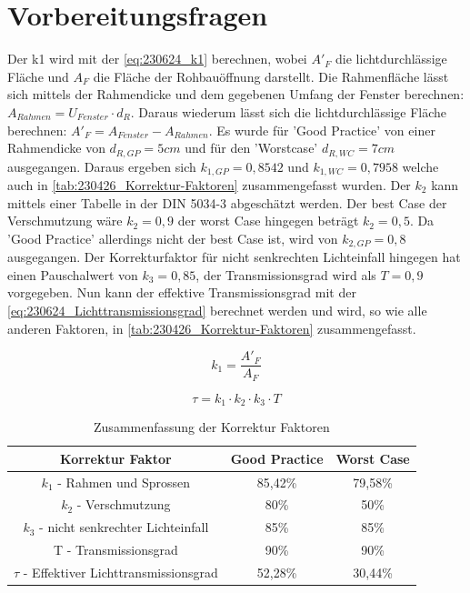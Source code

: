 \section{Vorbereitungsfragen}
\label{sec:Vorbereitungsfragen}

Der k1 wird mit der \autoref{eq:230624_k1} berechnen, wobei $A'_F$ die lichtdurchlässige Fläche und $A_F$ die Fläche der Rohbauöffnung darstellt.
Die Rahmenfläche lässt sich mittels der Rahmendicke und dem gegebenen Umfang der Fenster berechnen: $A_{Rahmen} = U_{Fenster} \cdot d_R$. 
Daraus wiederum lässt sich die lichtdurchlässige Fläche berechnen:  $A'_F = A_{Fenster} - A_{Rahmen}$.
Es wurde für 'Good Practice' von einer Rahmendicke von $d_{R,GP} = 5cm$ und für den 'Worstcase' $d_{R,WC} = 7 cm$ ausgegangen.
Daraus ergeben sich $k_{1,GP} = 0,8542$ und $k_{1,WC} = 0,7958$ welche auch in \autoref{tab:230426_Korrektur-Faktoren} zusammengefasst wurden.
Der $k_2$ kann mittels einer Tabelle in der DIN 5034-3 abgeschätzt werden.
Der best Case der Verschmutzung wäre $k_2 = 0,9$ der worst Case hingegen beträgt $k_2 = 0,5$.
Da 'Good Practice' allerdings nicht der best Case ist, wird von $k_{2,GP} = 0,8$ ausgegangen.
Der Korrekturfaktor für nicht senkrechten Lichteinfall hingegen hat einen Pauschalwert von $k_3 = 0,85$, der Transmissionsgrad wird als $T = 0,9$ vorgegeben.
Nun kann der effektive Transmissionsgrad mit der \autoref{eq:230624_Lichttransmissionsgrad} berechnet werden und wird, so wie alle anderen Faktoren, in \autoref{tab:230426_Korrektur-Faktoren} zusammengefasst.


\begin{equation}
    k_1 = \frac{A'_F}{A_F}
    \label{eq:230624_k1}
\end{equation}

\begin{equation}
    \tau = k_1 \cdot k_2 \cdot k_3 \cdot T
    \label{eq:230624_Lichttransmissionsgrad}
\end{equation}


\begin{table}[H]
    \caption{Zusammenfassung der Korrektur Faktoren}
    \centering
    \begin{tabular}{|c|c|c|}
    \hline
    \rowcolor[HTML]{70AD47} 
    Korrektur Faktor                                & Good Practice & Worst Case \\\hline
    \rowcolor[HTML]{CFE5A8} 
    $k_1$ - Rahmen und Sprossen                     & 85,42\%       & 79,58\%    \\\hline
    \rowcolor[HTML]{A9D08E} 
    $k_2$ - Verschmutzung                           & 80\%          & 50\%       \\\hline
    \rowcolor[HTML]{CFE5A8} 
    $k_3$ - nicht senkrechter Lichteinfall          & 85\%          & 85\%       \\\hline
    \rowcolor[HTML]{A9D08E} 
    T - Transmissionsgrad                           & 90\%          & 90\%       \\\hline
    \rowcolor[HTML]{CFE5A8} 
    $\tau$ - Effektiver Lichttransmissionsgrad      & 52,28\%       & 30,44\%   \\\hline
    \end{tabular}
    \label{tab:230426_Korrektur-Faktoren}
\end{table}

